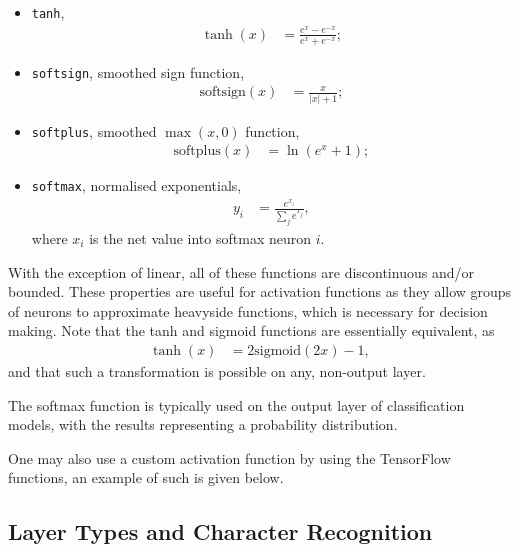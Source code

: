 \begin{itemize}
    \item\texttt{tanh},
        \begin{align*}
            \tanh(x) &= \frac{e^x - e^{-x}}{e^x + e^{-x}};
        \end{align*}

    \item\texttt{softsign}, smoothed sign function,
        \begin{align*}
            \text{softsign}(x) &= \frac{x}{|x| + 1};
        \end{align*}

    \item\texttt{softplus}, smoothed $\max(x,0)$ function,
        \begin{align*}
            \text{softplus}(x) &= \ln(e^x+1);
        \end{align*}

    \item\texttt{softmax}, normalised exponentials,
        \begin{align*}
            y_i &= \frac{e^{x_i}}{\sum_j e^{x_j}},
        \end{align*}
        where $x_i$ is the net value into softmax neuron $i$.
\end{itemize}
With the exception of linear, all of these functions are discontinuous and/or
bounded.
These properties are useful for activation functions as they allow groups of
neurons to approximate heavyside functions, which is necessary for decision
making.
Note that the tanh and sigmoid functions are essentially equivalent, as
\begin{align*}
    \tanh(x) &= 2\text{sigmoid}(2x) - 1,
\end{align*}
and that such a transformation is possible on any, non-output layer.

The softmax function is typically used on the output layer of classification
models, with the results representing a probability distribution.

One may also use a custom activation function by using the TensorFlow functions,
an example of such is given below.



\subsection{Layer Types and Character Recognition}

